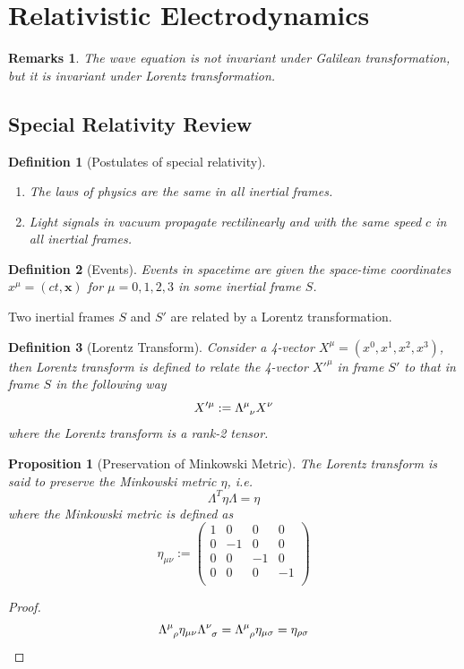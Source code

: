 \documentclass[a4paper]{article}
\newtheorem{remarks}{Remarks}[section]
\theoremstyle{new}
\newtheorem{defi}{Definition}[section]
\newtheorem{prop}{Proposition}[section]
\begin{document}
\newpage
\section{Relativistic Electrodynamics}
\begin{remarks}
The wave equation is not invariant under Galilean transformation, but it is invariant under Lorentz transformation.
\end{remarks}
\subsection{Special Relativity Review}
\begin{defi}[Postulates of special relativity]\leavevmode
\begin{enumerate}
    \item The laws of physics are the same in all inertial frames.
    \item Light signals in vacuum propagate rectilinearly and with the same speed $c$ in all inertial frames.
\end{enumerate}
\end{defi}
\begin{defi}[Events]
Events in spacetime are given the space-time coordinates $x^\mu=(ct,\mathbf{x})$ for $\mu=0,1,2,3$ in some inertial frame $S$.
\end{defi}
Two inertial frames $S$ and $S'$ are related by a Lorentz transformation.
\begin{defi}[Lorentz Transform]
Consider a 4-vector $X^\mu=(x^0,x^1,x^2,x^3)$, then Lorentz transform is defined to relate the 4-vector $X'^\mu$ in frame $S'$ to that in frame $S$ in the following way
$$X'^\mu:=\tensor*{\Lambda}{*_{}^{\mu}_{\nu}} X^\nu$$
where the Lorentz transform is a rank-2 tensor.
\end{defi}
\begin{prop}[Preservation of Minkowski Metric]
The Lorentz transform is said to preserve the Minkowski metric $\eta$, i.e.
$$\Lambda^T\eta\Lambda=\eta$$
where the Minkowski metric is defined as
$$\eta_{\mu\nu}:=\begin{pmatrix}1&0&0&0\\0&-1&0&0\\0&0&-1&0\\0&0&0&-1\\\end{pmatrix}$$
\end{prop}
\begin{proof}
$$\tensor*{\Lambda}{*_{}^{\mu}_{\rho}}\eta_{\mu\nu}\tensor*{\Lambda}{*_{}^{\nu}_{\sigma}}=\tensor*{\Lambda}{*_{}^{\mu}_{\rho}}\eta_{\mu\sigma}=\eta_{\rho\sigma}$$
\end{proof}
\end{document}
